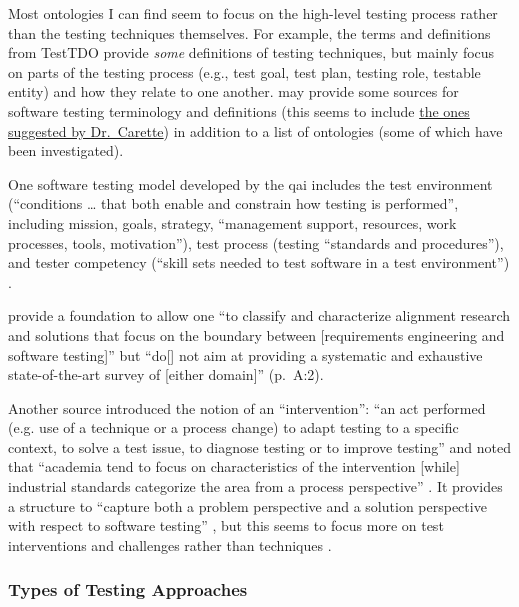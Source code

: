 Most ontologies I can find seem to focus on the high-level testing process
rather than the testing techniques themselves. For example, the terms and
definitions \citep{TebesEtAl2020b}
from TestTDO \citep{TebesEtAl2020a} provide \emph{some} definitions of
testing techniques, but mainly focus on parts of the testing process
(e.g., test goal, test plan, testing role, testable entity) and how they relate
to one another. \citet[pp.~152-153]{TebesEtAl2019} may provide some
sources for software testing terminology and definitions (this seems to include
\href{https://github.com/samm82/TestGen-Thesis/issues/14#issuecomment-1839922715}
{the ones suggested by Dr.~Carette}) in addition to a list of ontologies
(some of which have been investigated).

One software testing model developed by the \acf{qai} includes the test
environment (``conditions \dots
that both enable and constrain how testing is performed'', including mission,
goals, strategy, ``management support, resources, work processes, tools,
motivation''), test process (testing ``standards and procedures''), and tester
competency (``skill sets needed to test software in a test environment'')
\citep[pp.~5-6]{Perry2006}.

\citet{UnterkalmsteinerEtAl2014} provide a foundation to allow one ``to
classify and characterize alignment research and solutions that focus on the
boundary between [requirements engineering and software testing]'' but ``do[]
not aim at providing a systematic and exhaustive state-of-the-art survey of
      [either domain]'' (p.~A:2).

Another source
introduced the notion of an ``intervention'': ``an act performed (e.g. use of a
technique or a process change) to adapt testing to a specific context, to solve
a test issue, to diagnose testing or to improve testing''
\citep[p.~1]{engström_mapping_2015} and noted that ``academia tend to focus on
characteristics of the intervention [while] industrial standards categorize the
area from a process perspective'' \citep[p.~2]{engström_mapping_2015}.
It provides a structure to ``capture both a problem perspective and a solution
perspective with respect to software testing'' \citep[pp.~3-4]{engström_mapping_2015},
but this seems to focus more on test interventions and challenges rather than
techniques \citep[Fig.~5]{engström_mapping_2015}.

\subsubsection{Types of Testing Approaches}

